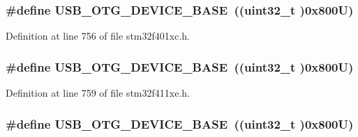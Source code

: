 \subsubsection[{\texorpdfstring{U\+S\+B\+\_\+\+O\+T\+G\+\_\+\+D\+E\+V\+I\+C\+E\+\_\+\+B\+A\+SE}{USB_OTG_DEVICE_BASE}}]{\setlength{\rightskip}{0pt plus 5cm}\#define U\+S\+B\+\_\+\+O\+T\+G\+\_\+\+D\+E\+V\+I\+C\+E\+\_\+\+B\+A\+SE~((uint32\+\_\+t )0x800\+U)}\hypertarget{group___peripheral__registers__structures_ga4d74a337597a77b1fca978202b519a18}{}\label{group___peripheral__registers__structures_ga4d74a337597a77b1fca978202b519a18}


Definition at line 756 of file stm32f401xc.\+h.

\subsubsection[{\texorpdfstring{U\+S\+B\+\_\+\+O\+T\+G\+\_\+\+D\+E\+V\+I\+C\+E\+\_\+\+B\+A\+SE}{USB_OTG_DEVICE_BASE}}]{\setlength{\rightskip}{0pt plus 5cm}\#define U\+S\+B\+\_\+\+O\+T\+G\+\_\+\+D\+E\+V\+I\+C\+E\+\_\+\+B\+A\+SE~((uint32\+\_\+t )0x800\+U)}\hypertarget{group___peripheral__registers__structures_ga4d74a337597a77b1fca978202b519a18}{}\label{group___peripheral__registers__structures_ga4d74a337597a77b1fca978202b519a18}


Definition at line 759 of file stm32f411xe.\+h.

\subsubsection[{\texorpdfstring{U\+S\+B\+\_\+\+O\+T\+G\+\_\+\+D\+E\+V\+I\+C\+E\+\_\+\+B\+A\+SE}{USB_OTG_DEVICE_BASE}}]{\setlength{\rightskip}{0pt plus 5cm}\#define U\+S\+B\+\_\+\+O\+T\+G\+\_\+\+D\+E\+V\+I\+C\+E\+\_\+\+B\+A\+SE~((uint32\+\_\+t )0x800\+U)}\hypertarget{group___peripheral__registers__structures_ga4d74a337597a77b1fca978202b519a18}{}\label{group___peripheral__registers__structures_ga4d74a337597a77b1fca978202b519a18}


